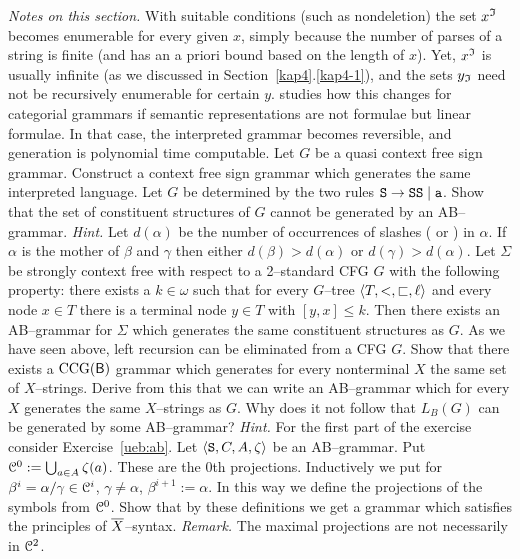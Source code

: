 {\it Notes on this section.} With suitable conditions (such as 
nondeletion) the set $x^{\mathfrak{I}}$ becomes enumerable for every 
given $x$, simply because the number of parses of a string is 
finite (and has an a priori bound based on the length of 
$x$). Yet, $x^{\mathfrak{I}}$ is usually infinite (as we discussed in 
Section~\ref{kap4}.\ref{kap4-1}), and the sets $y_{\mathfrak{I}}$ need not be 
recursively enumerable for certain $y$. \cite{pogodalla:reseaux} 
studies how this changes for categorial grammars if semantic 
representations are not formulae but linear formulae. In that 
case, the interpreted grammar becomes reversible, and generation 
is polynomial time computable.
\vplatz
\exercise
Let $G$ be a quasi context free sign grammar. Construct a 
context free sign grammar which generates the same interpreted 
language.
\vplatz
\exercise
Let $G$ be determined by the two rules
$\mbox{\tt S} \rightarrow \mbox{\tt SS} \mid \mbox{\tt a}$.
Show that the set of constituent structures of $G$ cannot be
generated by an AB--grammar. {\it Hint.} Let $d(\alpha)$  
be the number of occurrences of slashes ({\mtt{\tb}} or 
{\mtt{\tf}}) in $\alpha$. If $\alpha$ is the mother of $\beta$ 
and $\gamma$ then either $d(\beta) > d(\alpha)$ or $d(\gamma) > 
d(\alpha)$.
\vplatz
\exercise
Let $\Sigma$ be strongly context free with respect to a
2--standard CFG $G$ with the following property:
there exists a $k \in \omega$ such that for every $G$--tree
$\langle T, <, \sqsubset, \ell\rangle$ and every node $x \in T$ there 
is a terminal node $y \in T$ with $[y,x] \leq k$. Then there 
exists an AB--grammar for $\Sigma$ which generates the 
same constituent structures as $G$.
\vplatz
\exercise
As we have seen above, left recursion can be eliminated from
a CFG $G$. Show that there exists a $\operatorname{CCG}(\mathsf{B})$ 
grammar which generates for every nonterminal $X$ the same set 
of $X$--strings. Derive from this that we can write an AB--grammar 
which for every $X$ generates the same $X$--strings as $G$. Why 
does it not follow that $L_B(G)$ can be generated by some AB--grammar?
{\it Hint.} For the first part of the exercise consider
Exercise~\ref{ueb:ab}.
\vplatz
\exercise
Let $\langle \mbox{\tt S}, C, A, \zeta\rangle$ be an AB--grammar. Put
$\mathcal{C}^0 := \bigcup_{a \in A} \zeta(a)$. These are the 0th projections.
Inductively we put for $\beta^i = \alpha/\gamma \in \mathcal{C}^i$,
$\gamma \neq \alpha$, $\beta^{i+1} := \alpha$. In this way we
define the projections of the symbols from $\mathcal{C}^0$. Show that
by these definitions we get a grammar which satisfies the
principles of $\overline{X}$--syntax.  {\it Remark.} The maximal
projections are not necessarily in $\mathcal{C}^2$.

